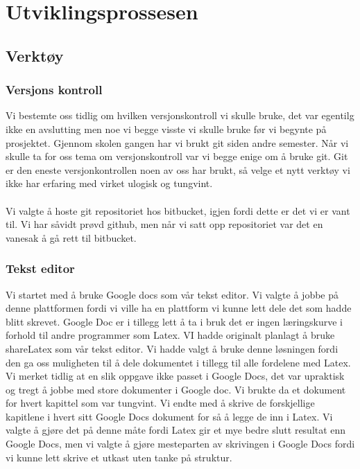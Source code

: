 \chapter{Utviklingsprossesen}
\label{chap:process}

\section{Verktøy}
\subsection{Versjons kontroll}
Vi bestemte oss tidlig om hvilken versjonskontroll vi skulle bruke, det var egentilg ikke en avslutting men noe vi begge visste vi skulle bruke før vi begynte på prosjektet. Gjennom skolen gangen har vi brukt git siden andre semester. Når vi skulle ta for oss tema om versjonskontroll var vi begge enige om å bruke git. Git er den eneste versjonkontrollen noen av oss har brukt, så velge et nytt verktøy vi ikke har erfaring med virket ulogisk og tungvint. \\ \\
Vi valgte å hoste git repositoriet hos bitbucket, igjen fordi dette er det vi er vant til. Vi har såvidt prøvd github, men når vi satt opp repositoriet var det en vanesak å gå rett til bitbucket.
\subsection{Tekst editor}
Vi startet med å bruke Google docs som vår tekst editor. Vi valgte å jobbe på denne plattformen fordi vi ville ha en plattform vi kunne lett dele det som hadde blitt skrevet. Google Doc er i tillegg lett å ta i bruk det er ingen læringskurve i forhold til andre programmer som Latex. VI hadde originalt planlagt å bruke shareLatex som vår tekst editor. Vi hadde valgt å bruke denne løsningen fordi den ga oss muligheten til å dele dokumentet i tillegg til alle fordelene med Latex. Vi merket tidlig at en slik oppgave ikke passet i Google Docs, det var upraktisk og tregt å jobbe med store dokumenter i Google doc. Vi brukte da et dokument for hvert kapittel som var tungvint. Vi endte med å skrive de forskjellige kapitlene i hvert sitt Google Docs dokument for så å legge de inn i Latex. Vi valgte å gjøre det på denne måte fordi Latex gir et mye bedre slutt resultat enn Google Docs, men vi valgte å gjøre mesteparten av skrivingen i Google Docs fordi vi kunne lett skrive et utkast uten tanke på struktur. 

